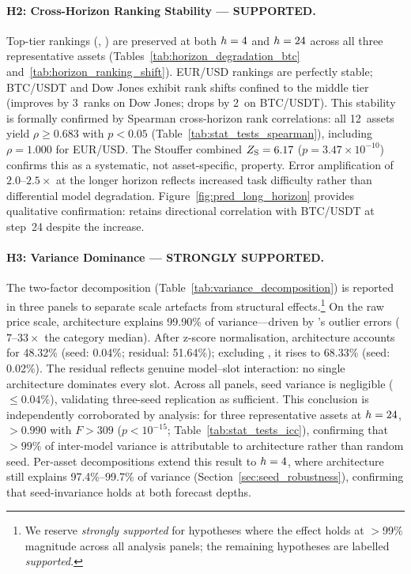 \paragraph{H2: Cross-Horizon Ranking Stability --- SUPPORTED.}
Top-tier rankings (\moderntcn, \patchtst) are preserved at both $h=4$ and $h=24$ across all three representative assets (Tables~\ref{tab:horizon_degradation_btc} and~\ref{tab:horizon_ranking_shift}).  EUR/USD rankings are perfectly stable; BTC/USDT and Dow Jones exhibit rank shifts confined to the middle tier (\nhits improves by 3~ranks on Dow Jones; \itransformer drops by 2~on BTC/USDT).  This stability is formally confirmed by Spearman cross-horizon rank correlations: all 12~assets yield $\rho \geq 0.683$ with $p < 0.05$ (Table~\ref{tab:stat_tests_spearman}), including $\rho = 1.000$ for EUR/USD.  The Stouffer combined $Z_\mathrm{S} = 6.17$ ($p = 3.47 \times 10^{-10}$) confirms this as a systematic, not asset-specific, property.  Error amplification of $2.0$--$2.5\times$ at the longer horizon reflects increased task difficulty rather than differential model degradation.  Figure~\ref{fig:pred_long_horizon} provides qualitative confirmation: \moderntcn retains directional correlation with BTC/USDT at step~24 despite the \rmse increase.

\paragraph{H3: Variance Dominance --- STRONGLY SUPPORTED.}
The two-factor decomposition (Table~\ref{tab:variance_decomposition}) is reported in three panels to separate scale artefacts from structural effects.\footnote{We reserve \emph{strongly supported} for hypotheses where the effect holds at $>$99\% magnitude across all analysis panels; the remaining hypotheses are labelled \emph{supported}.}  On the raw price scale, architecture explains 99.90\% of variance---driven by \lstm's outlier errors ($7$--$33\times$ the category median).  After z-score normalisation, architecture accounts for 48.32\% (seed: 0.04\%; residual: 51.64\%); excluding \lstm, it rises to 68.33\% (seed: 0.02\%).  The residual reflects genuine model--slot interaction: no single architecture dominates every slot.  Across all panels, seed variance is negligible ($\leq 0.04\%$), validating three-seed replication as sufficient.  This conclusion is independently corroborated by \icc analysis: for three representative assets at $h=24$, \icc $> 0.990$ with $F > 309$ ($p < 10^{-15}$; Table~\ref{tab:stat_tests_icc}), confirming that $>99\%$ of inter-model variance is attributable to architecture rather than random seed.  Per-asset decompositions extend this result to $h=4$, where architecture still explains 97.4\%--99.7\% of variance (Section~\ref{sec:seed_robustness}), confirming that seed-invariance holds at both forecast depths.

